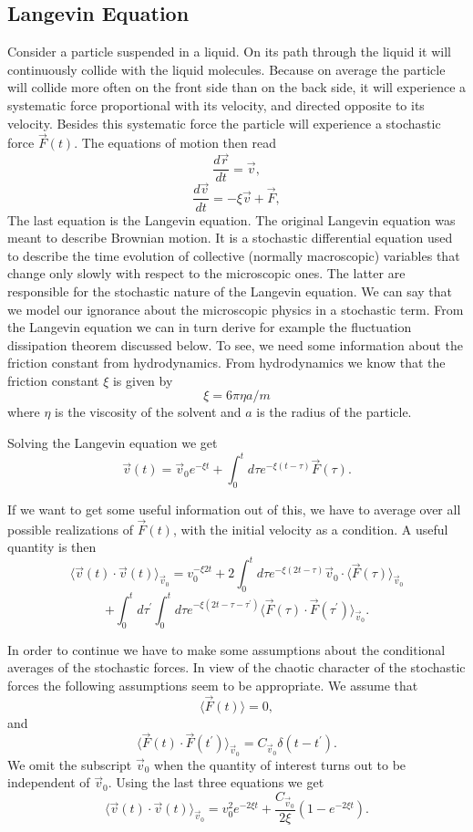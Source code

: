 \subsection{Langevin Equation}
Consider a particle suspended in a liquid. 
On its path through the liquid it will continuously collide with the liquid molecules. 
Because on average the particle will collide more often on the front side than on the back side, it will experience a systematic force proportional with its velocity, 
and directed opposite to its velocity. Besides this 
systematic force the particle will experience a stochastic force  $ \vec{F}(t)$. 
The equations of motion then read 
\[ 
 \frac{d\vec{r}}{dt} 	=  \vec{v},
\] 	
\[
\frac{d\vec{v}}{dt} 	=  -\xi \vec{v}+\vec{F},
\]
The last equation is the Langevin equation. The original Langevin equation was meant to  describe 
Brownian motion. It is a 
stochastic differential equation used to describe the time evolution of 
collective (normally macroscopic) variables that change only slowly with respect
to the microscopic ones. The latter are responsible for the stochastic nature of the Langevin equation.
We can say that we model our ignorance about the microscopic physics in a stochastic term.
From the Langevin equation we can in turn derive for example the fluctuation dissipation theorem
discussed below. To see, we need some information about the friction constant from hydrodynamics.
From hydrodynamics  we know that the friction constant  $\xi$ is given by
\[
\xi =6\pi \eta a/m 
\]
where $\eta$ is the viscosity  of the solvent and $a$ is the radius of the particle.

Solving the Langevin equation we get 
\[
\vec{v}(t)=\vec{v}_{0}e^{-\xi t}+\int_{0}^{t}d\tau e^{-\xi (t-\tau )}\vec{F }(\tau ). 
\]

If we want to get some useful information out of this, we have to average 
over all possible realizations of 
$ \vec{F}(t)$, with the initial velocity as a condition. A useful quantity is then
 \[ 
\langle \vec{v}(t)\cdot \vec{v}(t)\rangle_{\vec{v}_{0}}=v_{0}^{-\xi 2t}
+2\int_{0}^{t}d\tau e^{-\xi (2t-\tau)}\vec{v}_{0}\cdot \langle \vec{F}(\tau )\rangle_{\vec{v}_{0}}
\]
\[  	  	
 +\int_{0}^{t}d\tau ^{\prime }\int_{0}^{t}d\tau e^{-\xi (2t-\tau -\tau ^{\prime })}
\langle \vec{F}(\tau )\cdot \vec{F}(\tau ^{\prime })\rangle_{ \vec{v}_{0}}.
\]

In order to continue we have to make some assumptions 
about the conditional averages of the stochastic forces. 
In view of the chaotic character of the stochastic forces the following 
assumptions seem to be appropriate.
We assume that   
\[ \langle \vec{F}(t)\rangle 	= 	0, \]
and
\[\langle \vec{F}(t)\cdot \vec{F}(t^{\prime })\rangle_{\vec{v}_{0}}=  C_{\vec{v}_{0}}\delta (t-t^{\prime }).
\] 	
We omit the subscript $\vec{v}_{0}$ when the quantity of interest 
turns out to be independent of $\vec{v}_{0}$. Using the last three equations we get
 \[
\langle \vec{v}(t)\cdot \vec{v}(t)\rangle_{\vec{v}_{0}}=v_{0}^{2}e^{-2\xi t}+\frac{C_{\vec{v}_{0}}}{2\xi }(1-e^{-2\xi t}).\]

